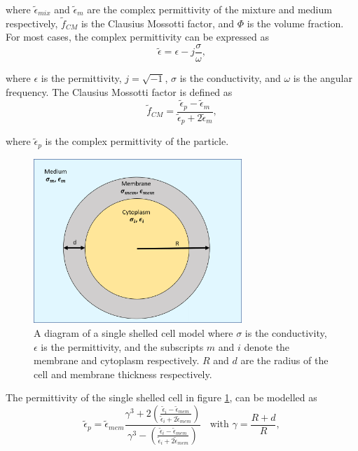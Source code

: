  \noindent where $\tilde{\epsilon}_{mix}$ and $\tilde{\epsilon}_m$ are the complex permittivity of the mixture and medium respectively, $\tilde{f}_{CM}$ is the Clausius Mossotti factor, and $\Phi$ is the volume fraction. For most cases, the complex permittivity can be expressed as
  \begin{equation}
    \tilde{\epsilon} = \epsilon - j\frac{\sigma}{\omega},
\end{equation}

\noindent where $\epsilon$ is the permittivity, $j = \sqrt{-1}$, $\sigma$ is the conductivity, and $\omega$ is the angular frequency. The Clausius Mossotti factor is defined as
  \begin{equation}
    \tilde{f}_{CM} = \frac{\tilde{\epsilon}_p - \tilde{\epsilon}_m}{\tilde{\epsilon}_p + 2\tilde{\epsilon}_m}, 
  \end{equation}
  
  \noindent where $\tilde{\epsilon}_p$ is the complex permittivity of the particle.

 \begin{figure}[ht]
 \centering
 \includegraphics[width=0.7\textwidth]{images/singleShelledCell.png}
 \caption[Diagram of single shelled cell model.]{A diagram of a single shelled cell model where $\sigma$ is the conductivity, $\epsilon$ is the permittivity, and the subscripts $m$ and $i$ denote the membrane and cytoplasm respectively. $R$ and $d$ are the radius of the cell and membrane thickness respectively.}
 \label{fig:single_shell}
 \end{figure}

  \par The permittivity of the single shelled cell in figure \ref{fig:single_shell}, can be modelled as
  \begin{equation}
      \tilde{\epsilon}_p = \tilde{\epsilon}_{mem} 
      \frac{\gamma^3+2(\frac{\tilde{\epsilon}_i - \tilde{\epsilon}_{mem}}
      {\tilde{\epsilon}_i + 2\tilde{\epsilon}_{mem}})}{\gamma^3 - (\frac{\tilde{\epsilon}_i - \tilde{\epsilon}_{mem}}{\tilde{\epsilon}_i + 2\tilde{\epsilon}_{mem}})} \;\;\text{  with } 
      \gamma = \frac{R + d}{R}, 
  \end{equation}
  
